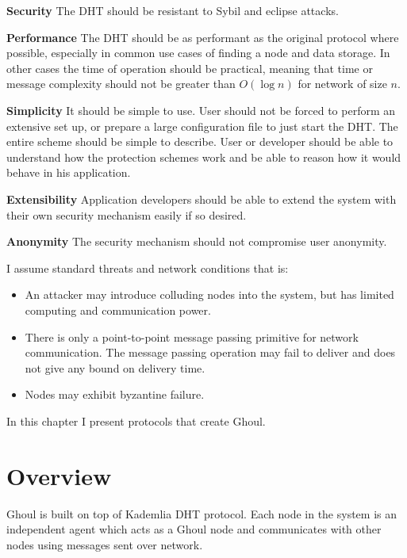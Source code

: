 \begin{description}
  \item{\textbf{Security}} The DHT should be resistant to Sybil and
    eclipse attacks.
  \item{\textbf{Performance}} The DHT should be as performant as the original
    protocol where possible, especially in common use cases of finding a node
    and data storage. In other cases the time of operation should be practical,
    meaning that time or message complexity should not be greater than $O(\log
    n)$ for network of size $n$.
  \item{\textbf{Simplicity}} It should be simple to use. User should not be
    forced to perform an extensive set up, or prepare a large configuration file
    to just start the DHT.  The entire scheme should be simple to describe. User
    or developer should be able to understand how the protection schemes work
    and be able to reason how it would behave in his application.
  \item{\textbf{Extensibility}} Application developers should be able to extend
    the system with their own security mechanism easily if so desired.
  \item{\textbf{Anonymity}} The security mechanism should not compromise user
    anonymity.
\end{description}

I assume standard threats and network conditions that is:

\begin{itemize}
  \item An attacker may introduce colluding nodes into the system, but has
    limited computing and communication power.
  \item There is only a point-to-point message passing primitive for network
    communication. The message passing operation may fail to deliver and does
    not give any bound on delivery time.
  \item Nodes may exhibit byzantine failure.
\end{itemize}

In this chapter I present protocols that create Ghoul.

\section{Overview}
Ghoul is built on top of Kademlia DHT protocol. Each node in the system is an
independent agent which acts as a Ghoul node and communicates with other nodes
using messages sent over network.

